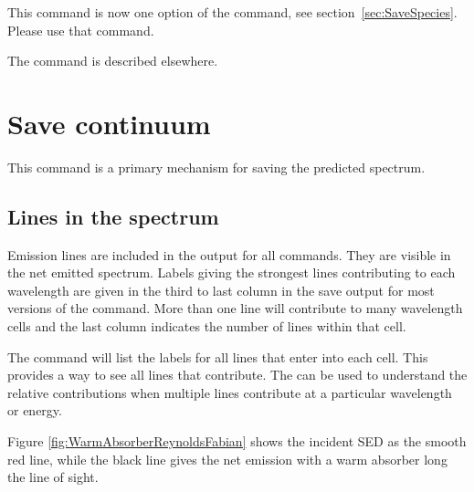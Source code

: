 This command is now one option of the  command,
see section~\ref{sec:SaveSpecies}.
Please use that command.

The  command is  described elsewhere.

\section{Save continuum}
\label{sec:CommandSaveContinuum}

This command is a primary mechanism for saving the predicted
spectrum.

\subsection{Lines in the spectrum}

Emission lines are included in the output for all
 commands.
They are visible in the net emitted spectrum.
Labels giving the strongest lines contributing to each wavelength
are given in the third to last column in the save output
for most versions of the  command.
More than one
line will contribute to many wavelength cells and the last column indicates
the number of lines within that cell.

The  command will list
the labels for all lines that enter into each cell.
This provides a way
to see all lines that contribute.
The  can be used to understand the 
relative contributions when multiple lines contribute
at a particular wavelength or energy.

Figure \ref{fig:WarmAbsorberReynoldsFabian} shows the incident
SED as the smooth red line, while the black line gives 
the net emission with a warm absorber long the line of sight. 

